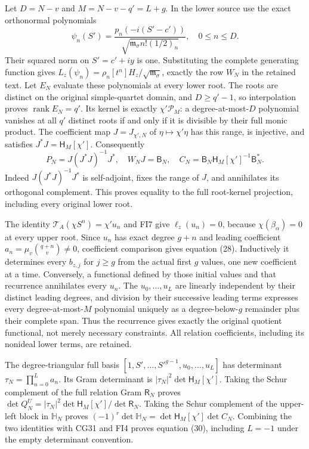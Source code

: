 \documentclass[11pt]{article}
\begin{document}
Let \(D=N-v\) and \(M=N-v-q'=L+g\). In the lower source use the exact orthonormal polynomials \[
 \psi_n(S')=\frac{p_n(-i(S'-c'))}{\sqrt{\mathfrak m_\sigma n!(1/2)_n}},\quad0\le n\le D.
\] Their squared norm on \(S'=c'+iy\) is one. Substituting the complete generating function gives \(L_z(\psi_n)=\rho_n[t^n]H_z/\sqrt{\mathfrak m_\sigma}\), exactly the row \(W_N\) in the retained text. Let \(E_N\) evaluate these polynomials at every lower root. The roots are distinct on the original simple-quartet domain, and \(D\ge q'-1\), so interpolation proves \(\operatorname{rank}E_N=q'\). Its kernel is exactly \(\chi'\mathcal P_M\): a degree-at-most-\(D\) polynomial vanishes at all \(q'\) distinct roots if and only if it is divisible by their full monic product. The coefficient map \(J=J_{\chi',N}\) of \(\eta\mapsto\chi'\eta\) has this range, is injective, and satisfies \(J^*J=\mathsf H_M[\chi']\). Consequently \[
 P_N=J(J^*J)^{-1}J^*,\quad W_NJ=\mathsf B_N,
 \quad C_N=\mathsf B_N\mathsf H_M[\chi']^{-1}\mathsf B_N^*.
 \tag{FI8}
\] Indeed \(J(J^*J)^{-1}J^*\) is self-adjoint, fixes the range of \(J\), and annihilates its orthogonal complement. This proves equality to the full root-kernel projection, including every original lower root.

The identity \(\mathcal T_A(\chi S^n)=\chi'u_n\) and FI7 give \(\ell_z(u_n)=0\), because \(\chi(\beta_\alpha)=0\) at every upper root. Since \(u_n\) has exact degree \(g+n\) and leading coefficient \(a_n=\mu_v\binom{q+n}{v}\ne0\), coefficient comparison gives equation (28). Inductively it determines every \(b_{z,j}\) for \(j\ge g\) from the actual first \(g\) values, one new coefficient at a time. Conversely, a functional defined by those initial values and that recurrence annihilates every \(u_n\). The \(u_0,\ldots,u_L\) are linearly independent by their distinct leading degrees, and division by their successive leading terms expresses every degree-at-most-\(M\) polynomial uniquely as a degree-below-\(g\) remainder plus their complete span. Thus the recurrence gives exactly the original quotient functional, not merely necessary constraints. All relation coefficients, including its nonideal lower terms, are retained.

The degree-triangular full basis \([1,S',\ldots,S'^{g-1},u_0,\ldots,u_L]\) has determinant \(\tau_N=\prod_{n=0}^La_n\). Its Gram determinant is \(|\tau_N|^2\det\mathsf H_M[\chi']\). Taking the Schur complement of the full relation Gram \(\mathsf R_N\) proves \(\det Q_N^U=|\tau_N|^2\det\mathsf H_M[\chi']/\det\mathsf R_N\). Taking the Schur complement of the upper-left block in \(\mathbb H_N\) proves \((-1)^r\det\mathbb H_N=\det\mathsf H_M[\chi']\det C_N\). Combining the two identities with CG31 and FI4 proves equation (30), including \(L=-1\) under the empty determinant convention.
\end{document}
